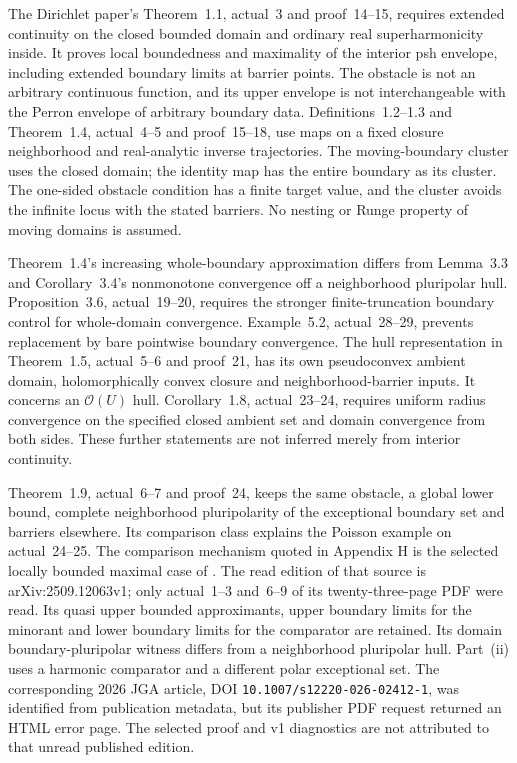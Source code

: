 The Dirichlet paper's Theorem~1.1, actual~3 and proof~14--15,
requires extended continuity on the closed bounded domain and
ordinary real superharmonicity inside. It proves local boundedness
and maximality of the interior psh envelope, including extended
boundary limits at barrier points. The obstacle is not an arbitrary
continuous function, and its upper envelope is not interchangeable
with the Perron envelope of arbitrary boundary data. Definitions~1.2--1.3
and Theorem~1.4, actual~4--5 and proof~15--18, use maps on a fixed
closure neighborhood and real-analytic inverse trajectories. The
moving-boundary cluster uses the closed domain; the identity map
has the entire boundary as its cluster. The one-sided obstacle
condition has a finite target value, and the cluster avoids the
infinite locus with the stated barriers. No nesting or Runge
property of moving domains is assumed.

Theorem~1.4's increasing whole-boundary approximation differs from
Lemma~3.3 and Corollary~3.4's nonmonotone convergence off a
neighborhood pluripolar hull. Proposition~3.6, actual~19--20,
requires the stronger finite-truncation boundary control for
whole-domain convergence. Example~5.2, actual~28--29, prevents
replacement by bare pointwise boundary convergence. The hull
representation in Theorem~1.5, actual~5--6 and proof~21, has its
own pseudoconvex ambient domain, holomorphically convex closure
and neighborhood-barrier inputs. It concerns an \(\mathcal O(U)\)
hull. Corollary~1.8, actual~23--24, requires uniform radius
convergence on the specified closed ambient set and domain
convergence from both sides. These further statements are not
inferred merely from interior continuity.

Theorem~1.9, actual~6--7 and proof~24, keeps the same obstacle,
a global lower bound, complete neighborhood pluripolarity of
the exceptional boundary set and barriers elsewhere. Its
comparison class explains the Poisson example on actual~24--25.
The comparison mechanism quoted in Appendix H is the selected
locally bounded maximal case of
\cite[Lemma~2.6(i), actual~8--9]{DieuLongHieu25QuasiBRegularV1}.
The read edition of that source is arXiv:2509.12063v1;
only actual~1--3 and~6--9 of its twenty-three-page PDF were read.
Its quasi upper bounded approximants, upper boundary limits for
the minorant and lower boundary limits for the comparator are
retained. Its domain boundary-pluripolar witness differs from
a neighborhood pluripolar hull. Part~(ii) uses a harmonic
comparator and a different polar exceptional set. The corresponding
2026 JGA article, DOI \nolinkurl{10.1007/s12220-026-02412-1}, was identified
from publication metadata, but its publisher PDF request returned
an HTML error page. The selected proof and v1 diagnostics are
not attributed to that unread published edition.

